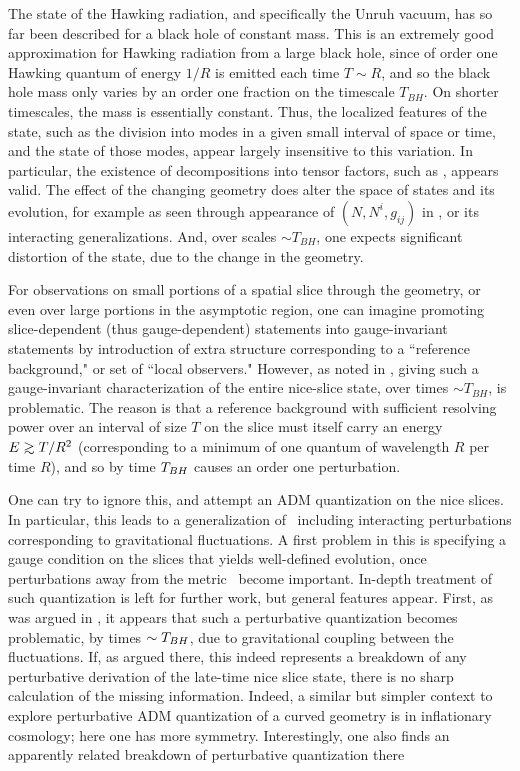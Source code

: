 
The  state of the Hawking radiation, and specifically the Unruh vacuum, has so far been described for a black hole of constant mass.  This is an extremely good approximation for Hawking radiation from a large black hole, since of order one Hawking quantum of energy $1/R$ is emitted each time $T\sim R$, and so the black hole mass only varies by an order one fraction on the timescale $T_{BH}$.
On shorter timescales, the mass is essentially constant.  Thus, the localized features of the state, such as the division into modes in a given small interval of space or time, and the state of those modes, appear largely insensitive to this variation.  In particular, the existence of decompositions into tensor factors, such as \hprod, appears valid.  The effect of the changing geometry does alter the space of states and its evolution, for example as seen through appearance of $(N,N^i,g_{ij})$ in \unitop, or its interacting generalizations.  
And, over scales $\sim T_{BH}$, one expects significant distortion of the state, due to the change in the geometry.

For observations on small portions of a spatial slice through the geometry, or even over large portions in the asymptotic region, one can imagine promoting slice-dependent (thus gauge-dependent) statements into gauge-invariant statements by introduction of extra structure  corresponding to a ``reference background,"  or  set of ``local observers."  However, as noted in \QBHB, giving such a gauge-invariant characterization of the entire nice-slice state, over times $\sim T_{BH}$, is problematic.  The reason is that a reference background with sufficient resolving power over an interval of size $T$ on the slice must itself carry an energy $E\roughly> T/R^2$ (corresponding to a minimum of one quantum of wavelength $R$ per time $R$), and so by time ${T_{BH}}$ causes an order one perturbation.  

One can try to ignore this, and attempt an ADM quantization on the nice slices.  In particular, this leads to a generalization of \unitop\ including interacting perturbations corresponding to gravitational fluctuations\QBHB. A first problem in this is specifying a gauge condition on the slices that yields well-defined evolution, once perturbations away from the metric \schmet\ become important.  In-depth treatment of such quantization is left for further work, but general features appear.  First, as was argued in \QBHB, it appears that such a perturbative quantization becomes problematic, by times $\sim{T_{BH}}$, due to gravitational coupling between the fluctuations.  If, as argued there, this indeed represents a breakdown of any perturbative derivation of the late-time nice slice state, there is no sharp calculation of the missing information.  Indeed, a similar but simpler context to explore perturbative ADM quantization of a curved geometry is in inflationary cosmology; here one has more symmetry.  Interestingly, one also finds an apparently related breakdown of perturbative quantization there 

